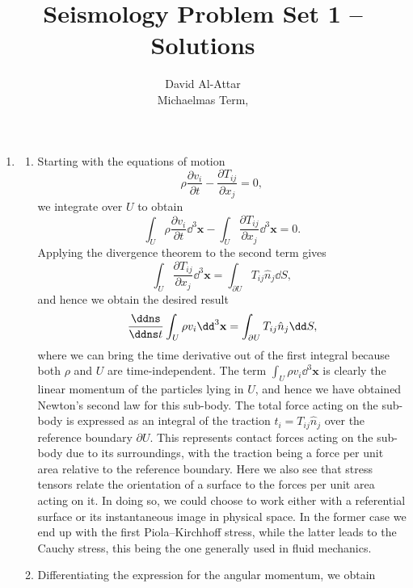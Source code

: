 \documentclass[a4paper,10pt]{paper}
\title{Seismology Problem Set 1 -- Solutions}
\author{David Al-Attar \\ Michaelmas Term, \the\year}
\begin{document}
\maketitle

\begin{enumerate}

    \item 
    \begin{enumerate}
\item Starting with the equations of motion
\begin{equation*}
    \rho\frac{\partial v_{i}}{\partial t}-\frac{\partial T_{ij}}{\partial x_{j}}=0,
\end{equation*}
we integrate over $U$ to obtain
\begin{equation*}
    \int_{U}\rho\frac{\partial v_{i}}{\partial t}\dd^{3}\mathbf{x}-\int_{U}\frac{\partial T_{ij}}{\partial x_{j}}\dd^{3}\mathbf{x}=0.
\end{equation*}
Applying the divergence theorem to the second term gives
\begin{equation*}
    \int_{U}\frac{\partial T_{ij}}{\partial x_{j}}\dd^{3}\mathbf{x}=\int_{\partial U}T_{ij}\hat{n}_{j}\dd S,
\end{equation*}
and hence we obtain the desired result
\begin{equation*}
    \frac{\ddns}{\ddns t}\int_{U}\rho v_{i}\dd^{3}\mathbf{x}=\int_{\partial U}T_{ij}\hat{n}_{j}\dd S,
\end{equation*}
where we can bring the time derivative out of the first integral because both $\rho$ and $U$ are time-independent. The term $\int_{U}\rho v_{i}\dd^{3}\mathbf{x}$ is clearly the linear momentum of the particles lying in $U$, and hence we have obtained Newton's second law for this sub-body. The total force acting on the sub-body is expressed as an integral of the traction $t_{i}=T_{ij}\hat{n}_{j}$ over the reference boundary $\partial U$. This represents contact forces acting on the sub-body due to its surroundings, with the traction being a force per unit area relative to the reference boundary. Here we also see that stress tensors relate the orientation of a surface to the forces per unit area acting on it. In doing so, we could choose to work either with a referential surface or its instantaneous image in physical space. In the former case we end up with the first Piola--Kirchhoff stress, while the latter leads to the Cauchy stress, this being the one generally used in fluid mechanics.
\item
Differentiating the expression for the angular momentum, we obtain

\end{enumerate}
\end{enumerate}
\end{document}
